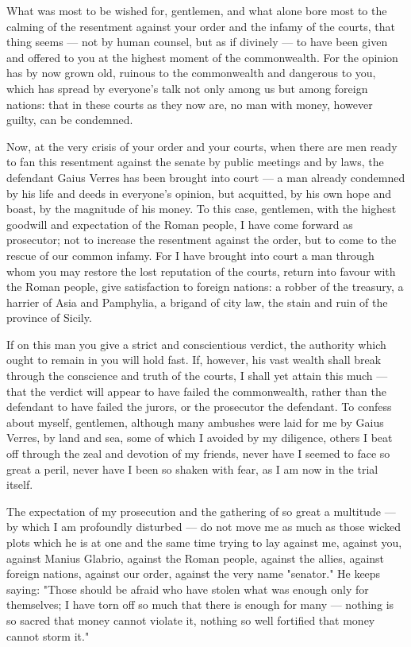 
 What was most to be wished for, gentlemen, and what alone bore most to the calming of the resentment against your order and the infamy of the courts, that thing seems --- not by human counsel, but as if divinely --- to have been given and offered to you at the highest moment of the commonwealth. For the opinion has by now grown old, ruinous to the commonwealth and dangerous to you, which has spread by everyone's talk not only among us but among foreign nations: that in these courts as they now are, no man with money, however guilty, can be condemned.

 Now, at the very crisis of your order and your courts, when there are men ready to fan this resentment against the senate by public meetings and by laws, the defendant Gaius Verres has been brought into court --- a man already condemned by his life and deeds in everyone's opinion, but acquitted, by his own hope and boast, by the magnitude of his money. To this case, gentlemen, with the highest goodwill and expectation of the Roman people, I have come forward as prosecutor; not to increase the resentment against the order, but to come to the rescue of our common infamy. For I have brought into court a man through whom you may restore the lost reputation of the courts, return into favour with the Roman people, give satisfaction to foreign nations: a robber of the treasury, a harrier of Asia and Pamphylia, a brigand of city law, the stain and ruin of the province of Sicily.

 If on this man you give a strict and conscientious verdict, the authority which ought to remain in you will hold fast. If, however, his vast wealth shall break through the conscience and truth of the courts, I shall yet attain this much --- that the verdict will appear to have failed the commonwealth, rather than the defendant to have failed the jurors, or the prosecutor the defendant. To confess about myself, gentlemen, although many ambushes were laid for me by Gaius Verres, by land and sea, some of which I avoided by my diligence, others I beat off through the zeal and devotion of my friends, never have I seemed to face so great a peril, never have I been so shaken with fear, as I am now in the trial itself.

 The expectation of my prosecution and the gathering of so great a multitude --- by which I am profoundly disturbed --- do not move me as much as those wicked plots which he is at one and the same time trying to lay against me, against you, against Manius Glabrio, against the Roman people, against the allies, against foreign nations, against our order, against the very name "senator." He keeps saying: "Those should be afraid who have stolen what was enough only for themselves; I have torn off so much that there is enough for many --- nothing is so sacred that money cannot violate it, nothing so well fortified that money cannot storm it."

